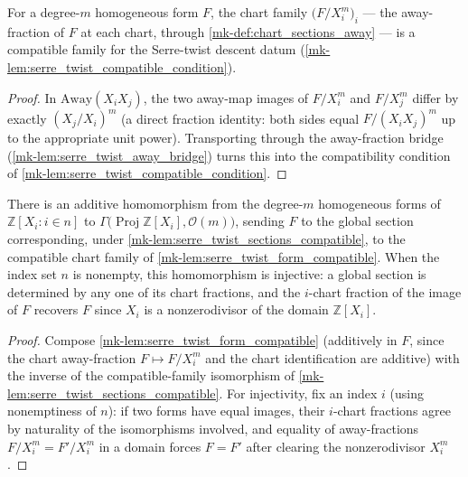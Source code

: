 \begin{lemma}\label{mk-lem:serre_twist_form_compatible}
  \leanok

  For a degree-\(m\) homogeneous form \(F\), the chart family
  \(\bigl(F/X_i^m\bigr)_i\) --- the away-fraction of \(F\) at each chart,
  through \ref{mk-def:chart_sections_away} --- is a compatible family for the
  Serre-twist descent datum (\ref{mk-lem:serre_twist_compatible_condition}).
\end{lemma}
\begin{proof}
  \leanok{}
  In \(\mathrm{Away}(X_i X_j)\), the two away-map images of \(F/X_i^m\) and
  \(F/X_j^m\) differ by exactly \((X_j/X_i)^m\) (a direct fraction identity:
  both sides equal \(F/(X_i X_j)^m\) up to the appropriate unit power).
  Transporting through the away-fraction bridge
  (\ref{mk-lem:serre_twist_away_bridge}) turns this into the compatibility
  condition of \ref{mk-lem:serre_twist_compatible_condition}.
\end{proof}

\begin{lemma}\label{mk-lem:serre_twist_forms_embed}
  \leanok

  There is an additive homomorphism from the degree-\(m\) homogeneous forms
  of \(\mathbb Z[X_i : i \in n]\) to \(\Gamma\bigl(\operatorname{Proj}
  \mathbb Z[X_i], \mathcal O(m)\bigr)\), sending \(F\) to the global section
  corresponding, under \ref{mk-lem:serre_twist_sections_compatible}, to the
  compatible chart family of \ref{mk-lem:serre_twist_form_compatible}. When the
  index set \(n\) is nonempty, this homomorphism is injective: a global
  section is determined by any one of its chart fractions, and the
  \(i\)-chart fraction of the image of \(F\) recovers \(F\) since \(X_i\) is
  a nonzerodivisor of the domain \(\mathbb Z[X_i]\).
\end{lemma}
\begin{proof}
  \leanok{}
  Compose \ref{mk-lem:serre_twist_form_compatible} (additively in \(F\), since
  the chart away-fraction \(F \mapsto F/X_i^m\) and the chart identification
  are additive) with the inverse of the compatible-family isomorphism of
  \ref{mk-lem:serre_twist_sections_compatible}. For injectivity, fix an index
  \(i\) (using nonemptiness of \(n\)): if two forms have equal images, their
  \(i\)-chart fractions agree by naturality of the isomorphisms involved,
  and equality of away-fractions \(F/X_i^m = F'/X_i^m\) in a domain forces
  \(F = F'\) after clearing the nonzerodivisor \(X_i^m\).
\end{proof}

